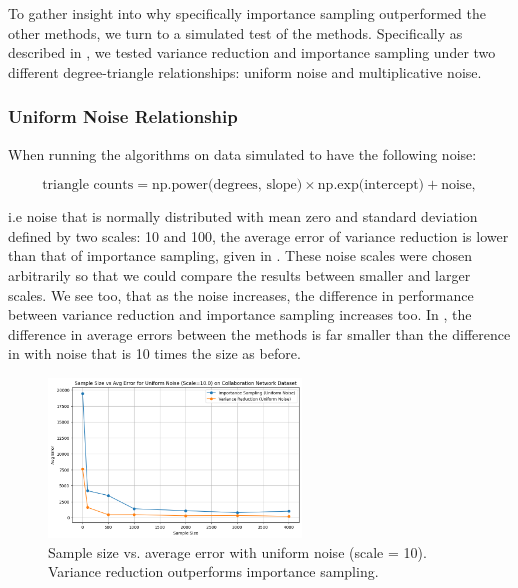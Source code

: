 \documentclass[11pt, margin=1in]{article}
\begin{document}
To gather insight into why specifically importance sampling outperformed the other methods, we turn to a simulated test of the methods.
Specifically as described in , we tested variance reduction and importance sampling under two different degree-triangle relationships: uniform noise and multiplicative noise.

\subsubsection{Uniform Noise Relationship}

When running the algorithms on data simulated to have the following noise:

\[
\text{triangle counts} = \text{np.power(degrees, slope)} \times \text{np.exp(intercept)} + \text{noise},
\]

i.e noise that is normally distributed with mean zero and standard deviation defined by two scales: 10 and 100, the average error of variance reduction is lower than that of importance sampling, given in .
These noise scales were chosen arbitrarily so that we could compare the results between smaller and larger scales.
We see too, that as the noise increases, the difference in performance between variance reduction and importance sampling increases too.
In , the difference in average errors between the methods is far smaller than the difference in  with noise that is 10 times the size as before.

\begin{figure}[H]
    \centering
    \includegraphics[width=0.6\textwidth]{plots/simulated/percent_error_vs_sample_size_comparison_uniform_10.0.png}
    \caption{Sample size vs. average error with uniform noise (scale = 10). Variance reduction outperforms importance sampling.}
    \label{fig:uniform_noise_10}
\end{figure}
\end{document}
